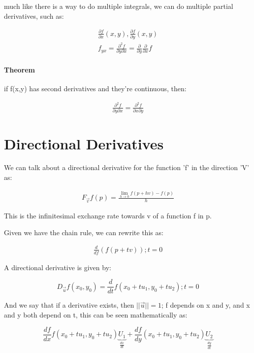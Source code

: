\documentclass[11pt,fleqn]{book} %
\begin{document}
much like there is a way to do multiple integrals, we can do multiple partial derivatives, such as:

\begin{gather}
    \frac{\partial f}{\partial x} (x,y),\frac{\partial f}{\partial y} (x,y) \\
    f_{yx} = \frac{\partial^2 f}{\partial y \partial x} = \frac{\partial}{\partial y} \frac{\partial}{\partial x} f
\end{gather}

\paragraph{Theorem}

if f(x,y) has second derivatives and they're continuous, then:

\begin{gather}
    \frac{\partial^2 f}{\partial y \partial x} = \frac{\partial^2 f}{\partial x \partial y}  
\end{gather}

\section{Directional Derivatives}

We can talk about a directional derivative for the function 'f' in the direction 'V' as:

\begin{gather}
    F_{\vec{v}} f(p) = \frac{\lim_{h \to 0} f(p+hv) - f(p)}{h}
\end{gather}

This is the infinitesimal exchange rate towards v of a function f in p.

Given we have the chain rule, we can rewrite this as:

\begin{gather}
    \frac{d}{df}(f(p+tv)) ; t = 0
\end{gather}

A directional derivative is given by:

\begin{equation}
    D_{\vec{u}}f(x_0,y_0) = \frac{d}{dt} f(x_0 + t u_1, y_0 + t u_2) ; t = 0
\end{equation}

And we say that if a derivative exists, then $||\vec{u}|| = 1$;
f depends on x and y, and x and y both depend on t, this can be seen mathematically as:

\begin{equation}
    \frac{df}{dx} f(x_0 + t u_1, y_0 + t u_2) \underbrace{U_1}_{\frac{dx}{dt}} + \frac{df}{dy}(x_0 + t u_1, y_0 + t u_2) \underbrace{U_2}_{\frac{dy}{dt}}
\end{equation}
\end{document}
